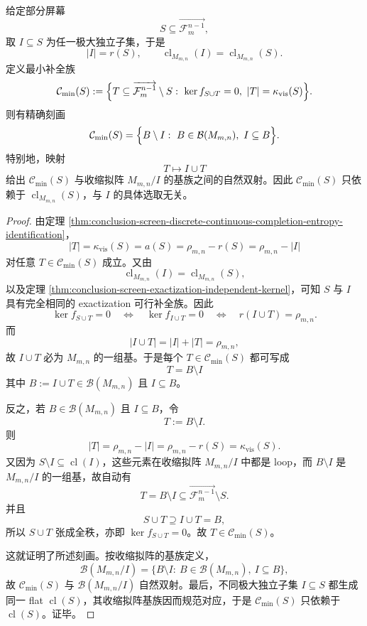 \begin{theorem}[最小补全族的独立核分类与闭包不变性]\label{thm:conclusion-screen-minimal-completion-family-independent-kernel}
给定部分屏幕
\[
S\subseteq \overrightarrow{\mathcal F_m^{n-1}},
\]
取 \(I\subseteq S\) 为任一极大独立子集，于是
\[
|I|=r(S),
\qquad
\operatorname{cl}_{M_{m,n}}(I)=\operatorname{cl}_{M_{m,n}}(S).
\]
定义最小补全族
\[
\mathcal C_{\min}(S)
:=
\Bigl\{
T\subseteq \overrightarrow{\mathcal F_m^{n-1}}\setminus S:\ 
\ker f_{S\cup T}=0,\
|T|=\kappa_{\mathrm{vis}}(S)
\Bigr\}.
\]
则有精确刻画
\[
\mathcal C_{\min}(S)
=
\Bigl\{
B\setminus I:\ 
B\in \mathcal B(M_{m,n}),\
I\subseteq B
\Bigr\}.
\]
特别地，映射
\[
T\longmapsto I\cup T
\]
给出 \(\mathcal C_{\min}(S)\) 与收缩拟阵 \(M_{m,n}/I\) 的基族之间的自然双射。因此 \(\mathcal C_{\min}(S)\) 只依赖于 \(\operatorname{cl}_{M_{m,n}}(S)\)，与 \(I\) 的具体选取无关。
\end{theorem}
\begin{proof}
由定理 \ref{thm:conclusion-screen-discrete-continuous-completion-entropy-identification}，
\[
|T|=\kappa_{\mathrm{vis}}(S)=a(S)=\rho_{m,n}-r(S)=\rho_{m,n}-|I|
\]
对任意 \(T\in\mathcal C_{\min}(S)\) 成立。又由
\[
\operatorname{cl}_{M_{m,n}}(I)=\operatorname{cl}_{M_{m,n}}(S),
\]
以及定理 \ref{thm:conclusion-screen-exactization-independent-kernel}，可知 \(S\) 与 \(I\) 具有完全相同的 exactization 可行补全族。因此
\[
\ker f_{S\cup T}=0
\quad\Longleftrightarrow\quad
\ker f_{I\cup T}=0
\quad\Longleftrightarrow\quad
r(I\cup T)=\rho_{m,n}.
\]
而
\[
|I\cup T|=|I|+|T|=\rho_{m,n},
\]
故 \(I\cup T\) 必为 \(M_{m,n}\) 的一组基。于是每个 \(T\in\mathcal C_{\min}(S)\) 都可写成
\[
T=B\setminus I
\]
其中 \(B:=I\cup T\in \mathcal B(M_{m,n})\) 且 \(I\subseteq B\)。

反之，若 \(B\in \mathcal B(M_{m,n})\) 且 \(I\subseteq B\)，令
\[
T:=B\setminus I.
\]
则
\[
|T|=\rho_{m,n}-|I|=\rho_{m,n}-r(S)=\kappa_{\mathrm{vis}}(S).
\]
又因为 \(S\setminus I\subseteq \operatorname{cl}(I)\)，这些元素在收缩拟阵 \(M_{m,n}/I\) 中都是 loop，而 \(B\setminus I\) 是 \(M_{m,n}/I\) 的一组基，故自动有
\[
T=B\setminus I\subseteq \overrightarrow{\mathcal F_m^{n-1}}\setminus S.
\]
并且
\[
S\cup T\supseteq I\cup T=B,
\]
所以 \(S\cup T\) 张成全秩，亦即 \(\ker f_{S\cup T}=0\)。故 \(T\in \mathcal C_{\min}(S)\)。

这就证明了所述刻画。按收缩拟阵的基族定义，
\[
\mathcal B(M_{m,n}/I)
=
\{B\setminus I:\ B\in \mathcal B(M_{m,n}),\ I\subseteq B\},
\]
故 \(\mathcal C_{\min}(S)\) 与 \(\mathcal B(M_{m,n}/I)\) 自然双射。最后，不同极大独立子集 \(I\subseteq S\) 都生成同一 flat \(\operatorname{cl}(S)\)，其收缩拟阵基族因而规范对应，于是 \(\mathcal C_{\min}(S)\) 只依赖于 \(\operatorname{cl}(S)\)。证毕。
\end{proof}

